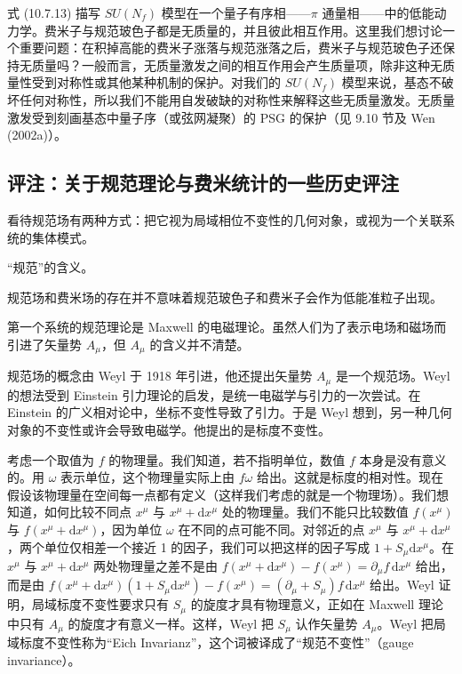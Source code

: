 式 (10.7.13) 描写 $SU(N_f)$ 模型在一个量子有序相——$\pi$ 通量相——中的低能动力学。费米子与规范玻色子都是无质量的，并且彼此相互作用。这里我们想讨论一个重要问题：在积掉高能的费米子涨落与规范涨落之后，费米子与规范玻色子还保持无质量吗？一般而言，无质量激发之间的相互作用会产生质量项，除非这种无质量性受到对称性或其他某种机制的保护。对我们的 $SU(N_f)$ 模型来说，基态不破坏任何对称性，所以我们不能用自发破缺的对称性来解释这些无质量激发。无质量激发受到刻画基态中量子序（或弦网凝聚）的 PSG 的保护（见 9.10 节及 Wen (2002a)）。

\subsection{评注：关于规范理论与费米统计的一些历史评注}

\begin{keypoints}
\item 看待规范场有两种方式：把它视为局域相位不变性的几何对象，或视为一个关联系统的集体模式。
\item “规范”的含义。
\item 规范场和费米场的存在并不意味着规范玻色子和费米子会作为低能准粒子出现。
\end{keypoints}

第一个系统的规范理论是 Maxwell 的电磁理论。虽然人们为了表示电场和磁场而引进了矢量势 $A_\mu$，但 $A_\mu$ 的含义并不清楚。

规范场的概念由 Weyl 于 1918 年引进，他还提出矢量势 $A_\mu$ 是一个规范场。Weyl 的想法受到 Einstein 引力理论的启发，是统一电磁学与引力的一次尝试。在 Einstein 的广义相对论中，坐标不变性导致了引力。于是 Weyl 想到，另一种几何对象的不变性或许会导致电磁学。他提出的是标度不变性。

考虑一个取值为 $f$ 的物理量。我们知道，若不指明单位，数值 $f$ 本身是没有意义的。用 $\omega$ 表示单位，这个物理量实际上由 $f\omega$ 给出。这就是标度的相对性。现在假设该物理量在空间每一点都有定义（这样我们考虑的就是一个物理场）。我们想知道，如何比较不同点 $x^{\mu}$ 与 $x^{\mu}+\mathrm{d}x^{\mu}$ 处的物理量。我们不能只比较数值 $f(x^{\mu})$ 与 $f(x^{\mu}+\mathrm{d}x^{\mu})$，因为单位 $\omega$ 在不同的点可能不同。对邻近的点 $x^{\mu}$ 与 $x^{\mu}+\mathrm{d}x^{\mu}$，两个单位仅相差一个接近 1 的因子，我们可以把这样的因子写成 $1+S_\mu\mathrm{d}x^{\mu}$。在 $x^{\mu}$ 与 $x^{\mu}+\mathrm{d}x^{\mu}$ 两处物理量之差不是由 $f(x^{\mu}+\mathrm{d}x^{\mu})-f(x^{\mu})=\partial_\mu f\,\mathrm{d}x^{\mu}$ 给出，而是由 $f(x^{\mu}+\mathrm{d}x^{\mu})(1+S_\mu\mathrm{d}x^{\mu})-f(x^{\mu})=(\partial_\mu+S_\mu)f\,\mathrm{d}x^{\mu}$ 给出。Weyl 证明，局域标度不变性要求只有 $S_\mu$ 的旋度才具有物理意义，正如在 Maxwell 理论中只有 $A_\mu$ 的旋度才有意义一样。这样，Weyl 把 $S_\mu$ 认作矢量势 $A_\mu$。Weyl 把局域标度不变性称为“Eich Invarianz”，这个词被译成了“规范不变性”（gauge invariance）。

